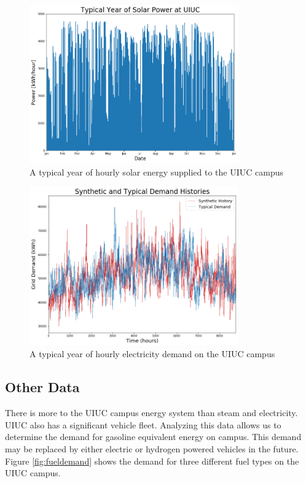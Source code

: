 \begin{figure}
  \centering
  \includegraphics[width=0.8\textwidth]{typicalsolar}
  \caption{A typical year of hourly solar energy supplied to the UIUC campus}
  \label{fig:typsol}
\end{figure}


\begin{figure}
  \centering
  \includegraphics[width=0.8\textwidth]{syntypdemand}
  \caption{A typical year of hourly electricity demand on the UIUC campus}
  \label{fig:synelc}
\end{figure}

\subsection{Other Data}
There is more to the UIUC campus energy system than steam and electricity. UIUC
also has a significant vehicle fleet. Analyzing this data allows us to determine
the demand for gasoline equivalent energy on campus. This demand may be replaced
by either electric or hydrogen powered vehicles in the future. Figure
\ref{fig:fueldemand} shows the demand for three different fuel types on the UIUC
campus.

